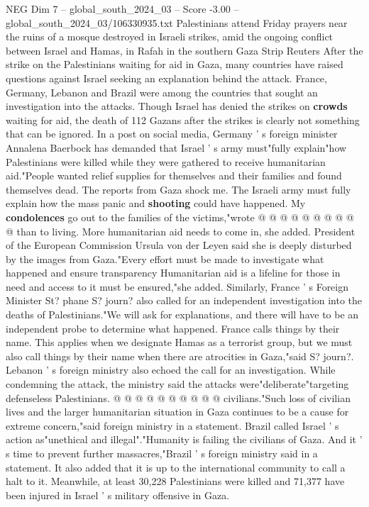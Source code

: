 \begin{textsample}{NEG Dim 7 – global\_south\_2024\_03 – Score -3.00 – global\_south\_2024\_03/106330935.txt}  \label{ex:f7_neg_429}
Palestinians attend Friday prayers near the ruins of a mosque destroyed in Israeli strikes, amid the ongoing conflict between Israel and Hamas, in Rafah in the southern Gaza Strip Reuters After the strike on the Palestinians waiting for aid in Gaza, many countries have raised questions against Israel seeking an explanation behind the attack.
France, Germany, Lebanon and Brazil were among the countries that sought an investigation into the attacks.
Though Israel has denied the strikes on \textbf{crowds} waiting for aid, the death of 112 Gazans after the strikes is clearly not something that can be ignored.
In a post on social media, Germany ' s foreign minister Annalena Baerbock has demanded that Israel ' s army must"fully explain"how Palestinians were killed while they were gathered to receive humanitarian aid."People wanted relief supplies for themselves and their families and found themselves dead.
The reports from Gaza shock me.
The Israeli army must fully explain how the mass panic and \textbf{shooting} could have happened.
My \textbf{condolences} go out to the families of the victims,"wrote @ @ @ @ @ @ @ @ @ @ than to living.
More humanitarian aid needs to come in, she added.
President of the European Commission Ursula von der Leyen said she is deeply disturbed by the images from Gaza."Every effort must be made to investigate what happened and ensure transparency Humanitarian aid is a lifeline for those in need and access to it must be ensured,"she added.
Similarly, France ' s Foreign Minister St? phane S? journ? also called for an independent investigation into the deaths of Palestinians."We will ask for explanations, and there will have to be an independent probe to determine what happened.
France calls things by their name.
This applies when we designate Hamas as a terrorist group, but we must also call things by their name when there are atrocities in Gaza,"said S? journ?.
Lebanon ' s foreign ministry also echoed the call for an investigation.
While condemning the attack, the ministry said the attacks were"deliberate"targeting defenseless Palestinians. @ @ @ @ @ @ @ @ @ @ civilians."Such loss of civilian lives and the larger humanitarian situation in Gaza continues to be a cause for extreme concern,"said foreign ministry in a statement.
Brazil called Israel ' s action as"unethical and illegal"."Humanity is failing the civilians of Gaza.
And it ' s time to prevent further massacres,"Brazil ' s foreign ministry said in a statement.
It also added that it is up to the international community to call a halt to it.
Meanwhile, at least 30,228 Palestinians were killed and 71,377 have been injured in Israel ' s military offensive in Gaza.

\end{textsample}
